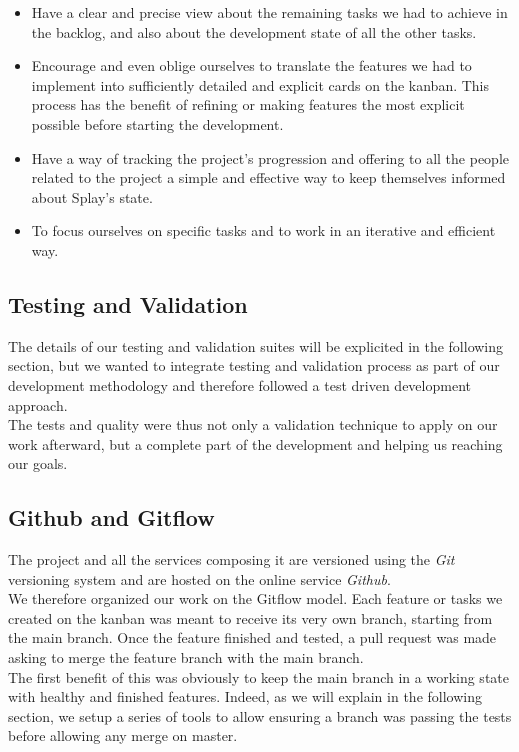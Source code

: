 \documentclass{eplmastersthesis}
\begin{document}
          \begin{itemize}
            \item Have a clear and precise view about the remaining tasks we had
            to achieve in the backlog, and also about the development state of
            all the other tasks.
            \item Encourage and even oblige ourselves to translate the features
            we had to implement into sufficiently detailed and explicit cards on
            the kanban. This process has the benefit of refining or making
            features the most explicit possible before starting the development.
            \item Have a way of tracking the project's progression and offering
            to all the people related to the project a simple and effective way
            to keep themselves informed about Splay's state.
            \item To focus ourselves on specific tasks and to work in an
            iterative and efficient way.
          \end{itemize}

        \subsection{Testing and Validation}

          The details of our testing and validation suites will be explicited
          in the following section, but we wanted to integrate testing and
          validation process as part of our development methodology and
          therefore followed a test driven development approach.\\
          The tests and quality were thus not only a validation technique to
          apply on our work afterward, but a complete part of the development
          and helping us reaching our goals.

        \subsection{Github and Gitflow}

          The project and all the services composing it are versioned using the
          \textit{Git} versioning system and are hosted on the online service
          \textit{Github}.\\
          We therefore organized our work on the Gitflow model. Each feature or
          tasks we created on the kanban was meant to receive its very own
          branch, starting from the main branch.
          Once the feature finished and tested, a pull request was made asking
          to merge the feature branch with the main branch.\\
          The first benefit of this was obviously to keep the main branch in
          a working state with healthy and finished features. Indeed, as
          we will explain in the following section, we setup a series of tools
          to allow ensuring a branch was passing the tests before allowing any
          merge on master.\\
\end{document}
